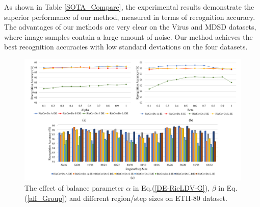 \documentclass[review]{elsarticle}
\begin{document}
	As shown in Table \ref{SOTA_Compare}, the experimental results demonstrate the superior performance of our method, measured in terms of recognition accuracy. The advantages of our methods are very clear on the Virus and MDSD datasets, where image samples contain a large amount of noise. Our method achieves the best recognition accuracies with low standard deviations on the four datasets.
\begin{figure}
\begin{center}
\includegraphics[width=0.99\linewidth]{Res_ETH.pdf} 
\end{center}
   \caption{The effect of balance parameter $\alpha$ in Eq.(\ref{DE-RieLDV-G}), $\beta$ in Eq.(\ref{aff_Group}) and different region/step sizes on ETH-80 dataset. }
\label{fig:short}
\end{figure}
\end{document}
